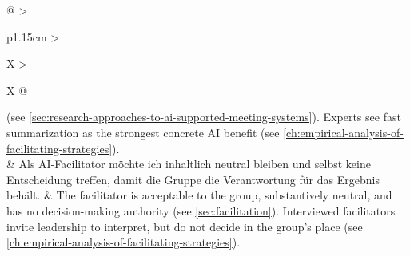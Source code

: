 \begin{xltabular}{\textwidth}{@{}
    >{\small\raggedright\arraybackslash}p{1.15cm}
    >{\small\raggedright\arraybackslash}X
    >{\small\raggedright\arraybackslash}X
  @{}}
  (see \autoref{sec:research-approaches-to-ai-supported-meeting-systems}).
  Experts see fast summarization as the strongest concrete AI benefit
  (see \autoref{ch:empirical-analysis-of-facilitating-strategies}). \\
  \usblocksep
  & Als AI-Facilitator möchte ich inhaltlich neutral bleiben und selbst keine Entscheidung treffen,
  damit die Gruppe die Verantwortung für das Ergebnis behält.
  & The facilitator is acceptable to the group, substantively neutral, and has no decision-making
  authority
  (see \autoref{sec:facilitation}).
  Interviewed facilitators invite leadership to interpret, but do not decide in the group's place
  (see \autoref{ch:empirical-analysis-of-facilitating-strategies}). \\
\end{xltabular}
\renewcommand{\arraystretch}{1}

